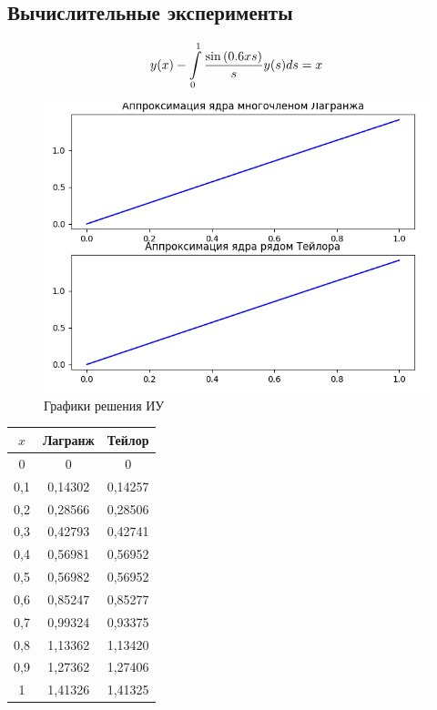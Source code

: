 \documentclass[14pt, a4paper]{extarticle}
\begin{document}
	\subsection{Вычислительные эксперименты}
	\[ y(x) - \int\displaylimits_{0}^{1} \dfrac{\sin{(0.6xs)}}{s}y(s)ds = x \]
	\begin{figure}[h]
		\centering
		\includegraphics[width = \linewidth]{plot_2.png}
		\caption{Графики решения ИУ}
	\end{figure}
	\begin{center}
		\begin{tabular}{ |c|c|c| }
			\hline
			$x$ & Лагранж & Тейлор\\
			\hline
			0 & 0 & 0\\
			\hline
			0,1 & 0,14302 & 0,14257\\
			\hline
			0,2 & 0,28566 & 0,28506\\
			\hline
			0,3 & 0,42793 & 0,42741\\
			\hline
			0,4 & 0,56981 & 0,56952\\
			\hline
			0,5 & 0,56982 & 0,56952\\
			\hline
			0,6 & 0,85247 & 0,85277\\
			\hline
			0,7 & 0,99324 & 0,93375\\
			\hline
			0,8 & 1,13362 & 1,13420\\
			\hline
			0,9 & 1,27362 & 1,27406\\
			\hline
			1 & 1,41326 & 1,41325\\
			\hline
		\end{tabular}
	\end{center}
\end{document}
